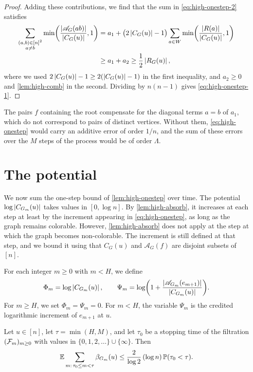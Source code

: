 \begin{proof}
Adding these contributions, we find that the sum in \eqref{eq:high-onestep-2} satisfies
\[
\begin{split}
\sum_{\substack{(a, b) \in [n]^2 \\ a \ne b}} \min \biggl( \frac{\left|\mathscr{A}_G(ab)\right|}{\left|C_G(u)\right|}, 1 \biggr) &= a_1 + \bigl( 2 \left|C_G(u)\right| - 1 \bigr) \sum_{a \in W} \min \biggl( \frac{\left|R(a)\right|}{\left|C_G(u)\right|}, 1 \biggr)\\
&\ge a_1 + a_2 \ge \frac{1}{2} \left|R_G(u)\right|,
\end{split}
\]
where we used $2 \left|C_G(u)\right| - 1 \ge 2 (\left|C_G(u)\right| - 1)$ in the first inequality, and $a_2 \ge 0$ and \cref{lem:high-comb} in the second. Dividing by $n(n - 1)$ gives \eqref{eq:high-onestep-1}.
\end{proof}

The pairs $f$ containing the root compensate for the diagonal terms $a = b$ of $a_1$, which do not correspond to pairs of distinct vertices. Without them, \eqref{eq:high-onestep} would carry an additive error of order $1/n$, and the sum of these errors over the $M$ steps of the process would be of order $\Lambda$.

\section{The potential}\label{sec:high-potential}

We now sum the one-step bound of \cref{lem:high-onestep} over time. The potential $\log \left|C_{G_m}(u)\right|$ takes values in $[0, \log n]$. By \cref{lem:high-absorb}, it increases at each step at least by the increment appearing in \eqref{eq:high-onestep}, as long as the graph remains colorable. However, \cref{lem:high-absorb} does not apply at the step at which the graph becomes non-colorable. The increment is still defined at that step, and we bound it using that $C_G(u)$ and $\mathscr{A}_G(f)$ are disjoint subsets of $[n]$.

For each integer $m \ge 0$ with $m < H$, we define
\[
\Phi_m = \log \left|C_{G_m}(u)\right|, \qquad \Psi_m = \log \biggl( 1 + \frac{\left|\mathscr{A}_{G_m}(e_{m + 1})\right|}{\left|C_{G_m}(u)\right|} \biggr).
\]
For $m \ge H$, we set $\Phi_m = \Psi_m = 0$. For $m < H$, the variable $\Psi_m$ is the credited logarithmic increment of $e_{m + 1}$ at $u$.

\begin{theorem}\label{thm:high-potential}
Let $u \in [n]$, let $\tau = \min(H, M)$, and let $\tau_0$ be a stopping time of the filtration $(\mathcal F_m)_{m \ge 0}$ with values in $\{0, 1, 2, \dots\} \cup \{\infty\}$. Then
\begin{equation}\label{eq:high-potential}
\mathbb E \sum_{m : \, \tau_0 \le m < \tau} \beta_{G_m}(u) \le \frac{2}{\log 2} \, (\log n) \, \mathbb P(\tau_0 < \tau).
\end{equation}
\end{theorem}

